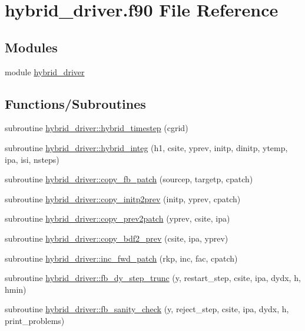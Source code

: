\hypertarget{hybrid__driver_8f90}{}\section{hybrid\+\_\+driver.\+f90 File Reference}
\label{hybrid__driver_8f90}
\subsection*{Modules}
\begin{DoxyCompactItemize}
\item 
module \hyperlink{namespacehybrid__driver}{hybrid\+\_\+driver}
\end{DoxyCompactItemize}
\subsection*{Functions/\+Subroutines}
\begin{DoxyCompactItemize}
\item 
subroutine \hyperlink{namespacehybrid__driver_a579b44c8008742b4e1728108d2c7b0d3}{hybrid\+\_\+driver\+::hybrid\+\_\+timestep} (cgrid)
\item 
subroutine \hyperlink{namespacehybrid__driver_a52e666b2508f9044046242011e0945b1}{hybrid\+\_\+driver\+::hybrid\+\_\+integ} (h1, csite, yprev, initp, dinitp, ytemp, ipa, isi, nsteps)
\item 
subroutine \hyperlink{namespacehybrid__driver_ab5e7ee3bf96e4ee6fe1b52b3c768db0b}{hybrid\+\_\+driver\+::copy\+\_\+fb\+\_\+patch} (sourcep, targetp, cpatch)
\item 
subroutine \hyperlink{namespacehybrid__driver_a72470c753a3eb027c7d2d29d7054526e}{hybrid\+\_\+driver\+::copy\+\_\+initp2prev} (initp, yprev, cpatch)
\item 
subroutine \hyperlink{namespacehybrid__driver_a28bce00da4b9cf70f7eb94256a861a86}{hybrid\+\_\+driver\+::copy\+\_\+prev2patch} (yprev, csite, ipa)
\item 
subroutine \hyperlink{namespacehybrid__driver_a192e08c05054785887dc5a7eb89ecee6}{hybrid\+\_\+driver\+::copy\+\_\+bdf2\+\_\+prev} (csite, ipa, yprev)
\item 
subroutine \hyperlink{namespacehybrid__driver_ae4f597f6df567c1353d263d5ff43f4fe}{hybrid\+\_\+driver\+::inc\+\_\+fwd\+\_\+patch} (rkp, inc, fac, cpatch)
\item 
subroutine \hyperlink{namespacehybrid__driver_a36e4df8dd012a0432cd71d44629c1046}{hybrid\+\_\+driver\+::fb\+\_\+dy\+\_\+step\+\_\+trunc} (y, restart\+\_\+step, csite, ipa, dydx, h, hmin)
\item 
subroutine \hyperlink{namespacehybrid__driver_a1f23f813ec743b56cdb89a4b4569c6eb}{hybrid\+\_\+driver\+::fb\+\_\+sanity\+\_\+check} (y, reject\+\_\+step, csite, ipa, dydx, h, print\+\_\+problems)
\end{DoxyCompactItemize}
